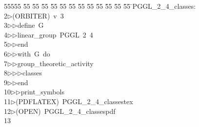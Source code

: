 %
%
\begin{tabbing}
55555 \= 55 \= 55 \= 55 \= 55 \= 55 \= 55 \= 55 \= 55 \= 55 \= 55 \= 55 \= 55 \= \>PGGL\_2\_4\_classes:\\[0pt]
2\>$\triangleright$\>(ORBITER)\ v\ 3\ \\[0pt]
3\>$\triangleright$\>$\triangleright$\>define\ G\ \\[0pt]
4\>$\triangleright$\>$\triangleright$\>linear\_group\ PGGL\ 2\ 4\ \\[0pt]
5\>$\triangleright$\>$\triangleright$\>end\ \\[0pt]
6\>$\triangleright$\>$\triangleright$\>with\ G\ do\ \\[0pt]
7\>$\triangleright$\>$\triangleright$\>group\_theoretic\_activity\ \\[0pt]
8\>$\triangleright$\>$\triangleright$\>$\triangleright$\>classes\ \\[0pt]
9\>$\triangleright$\>$\triangleright$\>end\ \\[0pt]
10\>$\triangleright$\>$\triangleright$\>print\_symbols\\[0pt]
11\>$\triangleright$\>(PDFLATEX)\ PGGL\_2\_4\_classestex\\[0pt]
12\>$\triangleright$\>(OPEN)\ PGGL\_2\_4\_classespdf\\[0pt]
13\>\end{tabbing}
